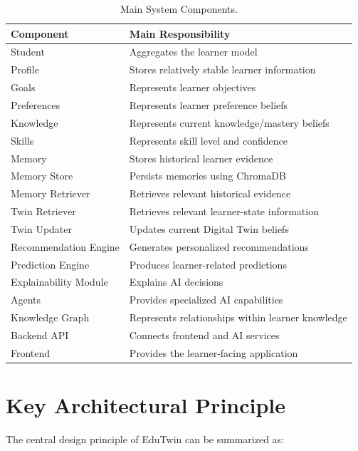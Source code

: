 \documentclass[12pt,a4paper]{article}
\begin{document}
\begin{table}[htbp]
\centering
\renewcommand{\arraystretch}{1.3}
\begin{tabular}{|l|p{9cm}|}
\hline
\textbf{Component} & \textbf{Main Responsibility} \\
\hline
Student & Aggregates the learner model \\
\hline
Profile & Stores relatively stable learner information \\
\hline
Goals & Represents learner objectives \\
\hline
Preferences & Represents learner preference beliefs \\
\hline
Knowledge & Represents current knowledge/mastery beliefs \\
\hline
Skills & Represents skill level and confidence \\
\hline
Memory & Stores historical learner evidence \\
\hline
Memory Store & Persists memories using ChromaDB \\
\hline
Memory Retriever & Retrieves relevant historical evidence \\
\hline
Twin Retriever & Retrieves relevant learner-state information \\
\hline
Twin Updater & Updates current Digital Twin beliefs \\
\hline
Recommendation Engine & Generates personalized recommendations \\
\hline
Prediction Engine & Produces learner-related predictions \\
\hline
Explainability Module & Explains AI decisions \\
\hline
Agents & Provides specialized AI capabilities \\
\hline
Knowledge Graph & Represents relationships within learner knowledge \\
\hline
Backend API & Connects frontend and AI services \\
\hline
Frontend & Provides the learner-facing application \\
\hline
\end{tabular}
\caption{Main System Components.}
\end{table}

\newpage
\section{Key Architectural Principle}
The central design principle of EduTwin can be summarized as:
\end{document}
